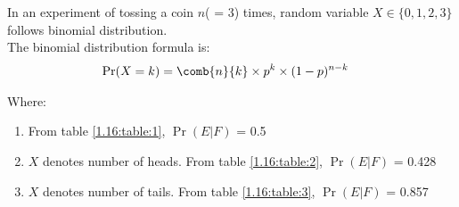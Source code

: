 In an experiment of tossing a coin $n$( = 3) times, random variable  $X \in \lbrace 0,1,2,3 \rbrace$ follows binomial distribution.\\
The binomial distribution formula is:
\begin{align*}
 \Pr( X=k ) &= \comb{n}{k} \times p^k \times (1- p)^{n - k}
\end{align*}

Where:


\begin{table}[h]

    \centering
\caption{The binomial distribution formula}
    \label{1.16:table:0}
\end{table}


\begin{enumerate}[label=(\roman*)]
    \item From table \ref{1.16:table:1}, $\Pr(E|F)$ = 0.5
    \item $X$ denotes number of heads. From table \ref{1.16:table:2}, $\Pr(E|F)$ = 0.428
    \item $X$ denotes number of tails. From table \ref{1.16:table:3}, $\Pr(E|F)$ = 0.857
\end{enumerate}


\begin{table}[ht]

    \centering
    \caption{Part(i)}
    \label{1.16:table:1}
\end{table}

